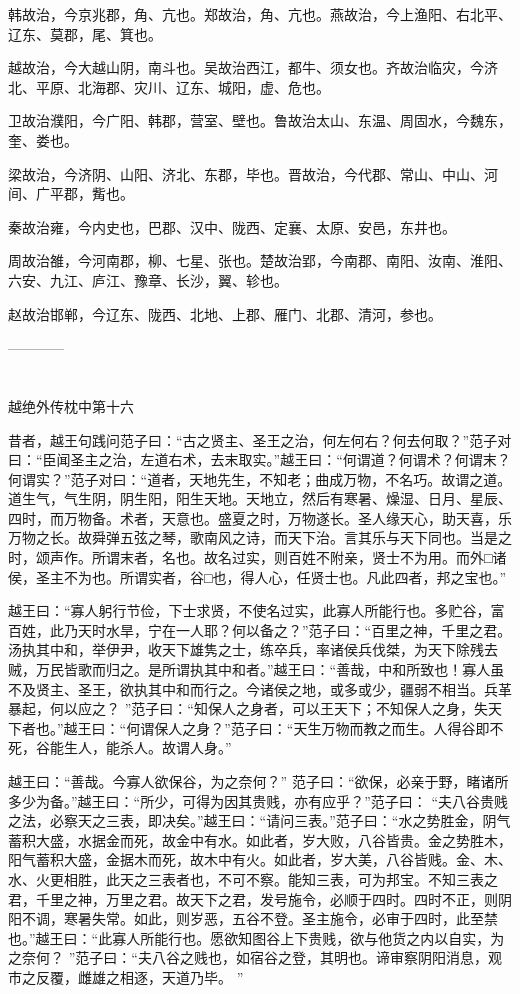 \documentclass[12pt,UTF8]{ctexbook}
\begin{document}
韩故治，今京兆郡，角、亢也。郑故治，角、亢也。燕故治，今上渔阳、右北平、辽东、莫郡，尾、箕也。

越故治，今大越山阴，南斗也。吴故治西江，都牛、须女也。齐故治临灾，今济北、平原、北海郡、灾川、辽东、城阳，虚、危也。

卫故治濮阳，今广阳、韩郡，营室、壁也。鲁故治太山、东温、周固水，今魏东，奎、娄也。

梁故治，今济阴、山阳、济北、东郡，毕也。晋故治，今代郡、常山、中山、河间、广平郡，觜也。

秦故治雍，今内史也，巴郡、汉中、陇西、定襄、太原、安邑，东井也。

周故治雒，今河南郡，柳、七星、张也。楚故治郢，今南郡、南阳、汝南、淮阳、六安、九江、庐江、豫章、长沙，翼、轸也。

赵故治邯郸，今辽东、陇西、北地、上郡、雁门、北郡、清河，参也。


------------

\part{}

越绝外传枕中第十六

昔者，越王句践问范子曰：“古之贤主、圣王之治，何左何右？何去何取？”范子对曰：“臣闻圣主之治，左道右术，去末取实。”越王曰：“何谓道？何谓术？何谓末？何谓实？”范子对曰：“道者，天地先生，不知老；曲成万物，不名巧。故谓之道。道生气，气生阴，阴生阳，阳生天地。天地立，然后有寒暑、燥湿、日月、星辰、四时，而万物备。术者，天意也。盛夏之时，万物遂长。圣人缘天心，助天喜，乐万物之长。故舜弹五弦之琴，歌南风之诗，而天下治。言其乐与天下同也。当是之时，颂声作。所谓末者，名也。故名过实，则百姓不附亲，贤士不为用。而外□诸侯，圣主不为也。所谓实者，谷□也，得人心，任贤士也。凡此四者，邦之宝也。”

越王曰：“寡人躬行节俭，下士求贤，不使名过实，此寡人所能行也。多贮谷，富百姓，此乃天时水旱，宁在一人耶？何以备之？”范子曰：“百里之神，千里之君。汤执其中和，举伊尹，收天下雄隽之士，练卒兵，率诸侯兵伐桀，为天下除残去贼，万民皆歌而归之。是所谓执其中和者。”越王曰：“善哉，中和所致也！寡人虽不及贤主、圣王，欲执其中和而行之。今诸侯之地，或多或少，疆弱不相当。兵革暴起，何以应之？ ”范子曰：“知保人之身者，可以王天下；不知保人之身，失天下者也。”越王曰：“何谓保人之身？”范子曰：“天生万物而教之而生。人得谷即不死，谷能生人，能杀人。故谓人身。”

越王曰：“善哉。今寡人欲保谷，为之奈何？” 范子曰：“欲保，必亲于野，睹诸所多少为备。”越王曰：“所少，可得为因其贵贱，亦有应乎？”范子曰： “夫八谷贵贱之法，必察天之三表，即决矣。”越王曰：“请问三表。”范子曰：“水之势胜金，阴气蓄积大盛，水据金而死，故金中有水。如此者，岁大败，八谷皆贵。金之势胜木，阳气蓄积大盛，金据木而死，故木中有火。如此者，岁大美，八谷皆贱。金、木、水、火更相胜，此天之三表者也，不可不察。能知三表，可为邦宝。不知三表之君，千里之神，万里之君。故天下之君，发号施令，必顺于四时。四时不正，则阴阳不调，寒暑失常。如此，则岁恶，五谷不登。圣主施令，必审于四时，此至禁也。”越王曰：“此寡人所能行也。愿欲知图谷上下贵贱，欲与他货之内以自实，为之奈何？ ”范子曰：“夫八谷之贱也，如宿谷之登，其明也。谛审察阴阳消息，观市之反覆，雌雄之相逐，天道乃毕。 ”
\end{document}
